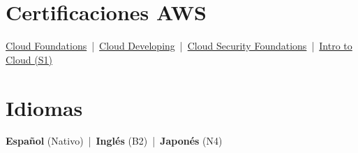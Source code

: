 \section{Certificaciones AWS}
\href{https://www.credly.com/badges/17c50411-0cbe-4586-bd34-00c130c92e22/public_url}{\faCertificate\; Cloud Foundations} \,|\,
\href{https://www.credly.com/badges/920866d4-e314-469b-87d3-b4da8c069864/public_url}{\faCertificate\; Cloud Developing} \,|\,
\href{https://www.credly.com/badges/dbcfcfd3-7d99-4877-b777-1489e1edf8d5/public_url}{\faCertificate\; Cloud Security Foundations} \,|\,
\href{https://www.credly.com/badges/657cf76c-0b10-40ba-a55d-62f35c764ac2/public_url}{\faCertificate\; Intro to Cloud (S1)}

\section{Idiomas}
\textbf{Espa\~nol} (Nativo) \,|\, \textbf{Ingl\'es} (B2) \,|\, \textbf{Japon\'es} (N4)